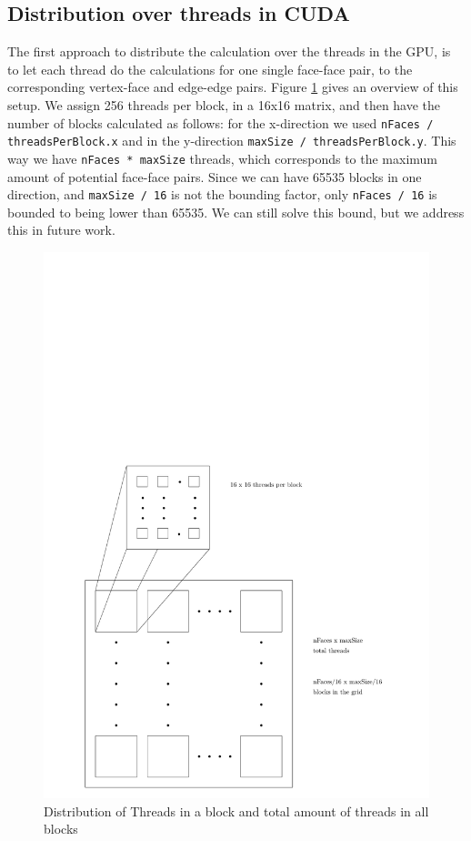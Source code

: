 \subsection{Distribution over threads in CUDA}
The first approach to distribute the calculation over the threads in the GPU, is to let each thread do the calculations for one single face-face pair, to the corresponding vertex-face and edge-edge pairs. Figure \ref{fig:threaddist} gives an overview of this setup. We assign 256 threads per block, in a 16x16 matrix, and then have the number of blocks calculated as follows: for the x-direction we used \texttt{nFaces / threadsPerBlock.x} and in the y-direction \texttt{maxSize / threadsPerBlock.y}. This way we have \texttt{nFaces * maxSize} threads, which corresponds to the maximum amount of potential face-face pairs. Since we can have 65535 blocks in one direction, and \texttt{maxSize / 16} is not the bounding factor, only \texttt{nFaces / 16} is bounded to being lower than 65535. We can still solve this bound, but we address this in future work.\\

\begin{figure}
	\includegraphics{Threads.pdf}
	\caption{Distribution of Threads in a block and total amount of threads in all blocks}
	\label{fig:threaddist}
\end{figure}

